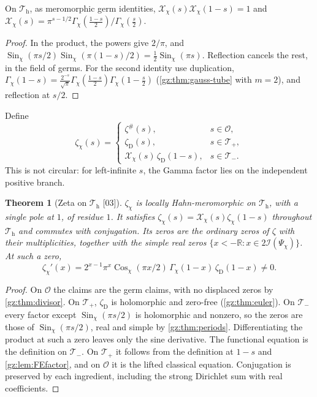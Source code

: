 \documentclass[11pt,a4paper]{article}
\numberwithin{equation}{section}
\newtheorem{theorem}{Theorem}[section]
\theoremstyle{definition}
\theoremstyle{remark}
\newcommand{\R}{\mathbb R}
\newcommand{\OO}{\mathcal O}
\newcommand{\Sin}{\operatorname{Sin}}
\newcommand{\Cos}{\operatorname{Cos}}
\newcommand{\cI}{\mathcal I}
\newcommand{\zD}{\zeta_{\mathrm D}}
\newcommand{\zp}{\zeta^{\#}}
\newcommand{\FE}{\mathcal X}
\newcommand{\Tp}{\mathcal T_{+}}
\newcommand{\Tm}{\mathcal T_{-}}
\newcommand{\Th}{\mathcal T_{\mathrm h}}
\newcommand{\src}[1]{\textup{[#1]}}
\begin{document}
\begin{lemma}[The reflection factor \src{03}]\label{gz:lem:FEfactor}
On $\Th$, as meromorphic germ identities, $\FE_\chi(s)\FE_\chi(1-s)=1$ and
$\FE_\chi(s)=\pi^{s-1/2}\Gamma_\chi(\tfrac{1-s}2)/\Gamma_\chi(\tfrac s2)$.
\end{lemma}
\begin{proof}
In the product, the powers give $2/\pi$, and
$\Sin_\chi(\pi s/2)\Sin_\chi(\pi(1-s)/2)=\tfrac12\Sin_\chi(\pi s)$. Reflection
cancels the rest, in the field of germs. For the second identity use
duplication, $\Gamma_\chi(1-s)=\frac{2^{-s}}{\sqrt\pi}\Gamma_\chi(\tfrac{1-s}2)\Gamma_\chi(1-\tfrac s2)$
(\cref{gz:thm:gauss-tube} with $m=2$), and reflection at $s/2$.
\end{proof}

Define
\[
\zeta_\chi(s)=\begin{cases}\zp(s),&s\in\OO,\\ \zD(s),&s\in\Tp,\\ \FE_\chi(s)\,\zD(1-s),&s\in\Tm.\end{cases}
\]
This is not circular: for left-infinite $s$, the Gamma factor lies on the
independent positive branch.

\begin{theorem}[Zeta on $\Th$ \src{03}]\label{gz:thm:zeta-tube}
$\zeta_\chi$ is locally Hahn-meromorphic on $\Th$, with a single pole at $1$,
of residue $1$. It satisfies $\zeta_\chi(s)=\FE_\chi(s)\zeta_\chi(1-s)$
throughout $\Th$ and commutes with conjugation. Its zeros are the ordinary
zeros of $\zeta$ with their multiplicities, together with the simple real
zeros $\{x<-\R:x\in2\cI(\Psi_\chi)\}$. At such a zero,
\[
\zeta_\chi'(x)=2^{x-1}\pi^x\Cos_\chi(\pi x/2)\,\Gamma_\chi(1-x)\,\zD(1-x)\ne0 .
\]
\end{theorem}
\begin{proof}
On $\OO$ the claims are the germ claims, with no displaced zeros by
\cref{gz:thm:divisor}. On $\Tp$, $\zD$ is holomorphic and zero-free
(\cref{gz:thm:euler}). On $\Tm$ every factor except $\Sin_\chi(\pi s/2)$ is
holomorphic and nonzero, so the zeros are those of $\Sin_\chi(\pi s/2)$,
real and simple by \cref{gz:thm:periods}. Differentiating the product at
such a zero leaves only the sine derivative. The functional equation is the
definition on $\Tm$. On $\Tp$ it follows from the definition at $1-s$ and
\cref{gz:lem:FEfactor}, and on $\OO$ it is the lifted classical equation.
Conjugation is preserved by each ingredient, including the strong Dirichlet
sum with real coefficients.
\end{proof}
\end{document}

